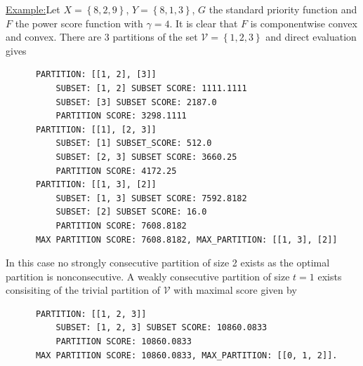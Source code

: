 \documentclass{article}
\theoremstyle{case}
\newenvironment{example}[1]{\par\noindent\underline{Example:}\space#1}{}
\begin{document}
\begin{example}
Let $X = \left\lbrace 8, 2, 9\right\rbrace$, $Y = \left\lbrace  8, 1, 3\right\rbrace$, $G$ the standard priority function and $F$ the power score function with $\gamma = 4$. It is clear that $F$ is componentwise convex and convex. There are 3 partitions of the set $\mathcal{V} = \left\lbrace 1,2,3 \right\rbrace$ and direct evaluation gives
\begin{verbatim}
      PARTITION: [[1, 2], [3]]
          SUBSET: [1, 2] SUBSET SCORE: 1111.1111
          SUBSET: [3] SUBSET SCORE: 2187.0
          PARTITION SCORE: 3298.1111
      PARTITION: [[1], [2, 3]]
          SUBSET: [1] SUBSET_SCORE: 512.0
          SUBSET: [2, 3] SUBSET SCORE: 3660.25
          PARTITION SCORE: 4172.25
      PARTITION: [[1, 3], [2]]
          SUBSET: [1, 3] SUBSET SCORE: 7592.8182
          SUBSET: [2] SUBSET SCORE: 16.0
          PARTITION SCORE: 7608.8182
      MAX PARTITION SCORE: 7608.8182, MAX_PARTITION: [[1, 3], [2]]
\end{verbatim}
In this case no strongly consecutive partition of size 2 exists as the optimal partition is nonconsecutive. A weakly consecutive partition of size $t = 1$ exists consisiting of the trivial partition of $\mathcal{V}$ with maximal score given by
\begin{verbatim}
      PARTITION: [[1, 2, 3]]
          SUBSET: [1, 2, 3] SUBSET SCORE: 10860.0833
          PARTITION SCORE: 10860.0833
      MAX PARTITION SCORE: 10860.0833, MAX_PARTITION: [[0, 1, 2]].
\end{verbatim}  
\end{example}
\end{document}
